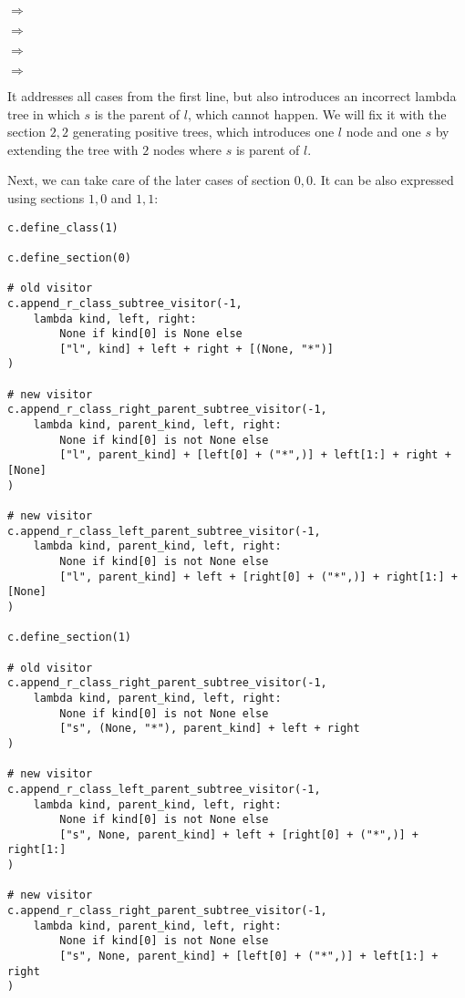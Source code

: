 \documentclass[final]{article}
\theoremstyle{definition}
\theoremstyle{definition}
\theoremstyle{remark}
\newcommand{\includeinlinesvg}[2]{\begin{minipage}{#1\textwidth}\end{minipage}}
\begin{document}
\includeinlinesvg{.24}{lambda__trees_100__0_base}\(\Rightarrow\)\includeinlinesvg{.24}{lambda__trees_100__0}%
\includeinlinesvg{.24}{lambda__trees_100__1_base}\(\Rightarrow\)\includeinlinesvg{.24}{lambda__trees_100__1}%

\includeinlinesvg{.24}{lambda__trees_100__2_base}\(\Rightarrow\)\includeinlinesvg{.24}{lambda__trees_100__2}%
\includeinlinesvg{.24}{lambda__trees_100__3_base}\(\Rightarrow\)\includeinlinesvg{.24}{lambda__trees_100__3}%

It addresses all cases from the first line, but also introduces an incorrect lambda tree in which \(s\) is the parent of \(l\), which cannot happen. We will fix it with the section \(2,2\) generating positive trees, which introduces one \(l\) node and one \(s\) by extending the tree with \(2\) nodes where \(s\) is parent of \(l\).

Next, we can take care of the later cases of section \(0, 0\). It can be also expressed using sections \(1, 0\) and \(1, 1\):

\begin{lstlisting}
c.define_class(1)

c.define_section(0)

# old visitor
c.append_r_class_subtree_visitor(-1,
    lambda kind, left, right:
        None if kind[0] is None else
        ["l", kind] + left + right + [(None, "*")]
)

# new visitor
c.append_r_class_right_parent_subtree_visitor(-1,
    lambda kind, parent_kind, left, right:
        None if kind[0] is not None else
        ["l", parent_kind] + [left[0] + ("*",)] + left[1:] + right + [None]
)

# new visitor
c.append_r_class_left_parent_subtree_visitor(-1,
    lambda kind, parent_kind, left, right:
        None if kind[0] is not None else
        ["l", parent_kind] + left + [right[0] + ("*",)] + right[1:] + [None]
)

c.define_section(1)

# old visitor
c.append_r_class_right_parent_subtree_visitor(-1,
    lambda kind, parent_kind, left, right:
        None if kind[0] is not None else
        ["s", (None, "*"), parent_kind] + left + right
)

# new visitor
c.append_r_class_left_parent_subtree_visitor(-1,
    lambda kind, parent_kind, left, right:
        None if kind[0] is not None else
        ["s", None, parent_kind] + left + [right[0] + ("*",)] + right[1:]
)

# new visitor
c.append_r_class_right_parent_subtree_visitor(-1,
    lambda kind, parent_kind, left, right:
        None if kind[0] is not None else
        ["s", None, parent_kind] + [left[0] + ("*",)] + left[1:] + right
)
\end{lstlisting}
\end{document}
